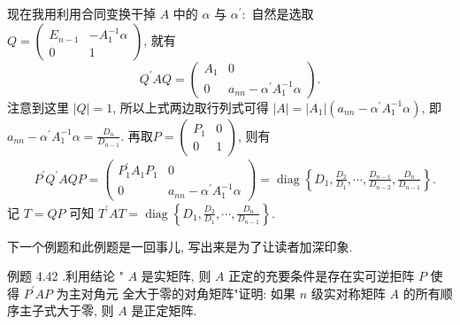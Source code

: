 \documentclass{article}
\begin{document}
现在我用利用合同变换干掉 $A$ 中的 $\alpha$ 与 $\alpha^{\prime}:$ 自然是选取 $Q=\left(\begin{array}{cc}E_{n-1} & -A_{1}^{-1} \alpha \\ 0 & 1\end{array}\right)$, 就有
\begin{equation*}
    Q^{\prime} A Q=\left(\begin{array}{cc}
            A_{1} & 0                                         \\
            0     & a_{n n}-\alpha^{\prime} A_{1}^{-1} \alpha
        \end{array}\right).
\end{equation*}
注意到这里 $|Q|=1$, 所以上式两边取行列式可得 $|A|=\left|A_{1}\right|\left(a_{n n}-\alpha^{\prime} A_{1}^{-1} \alpha\right)$, 即 $a_{n n}-\alpha^{\prime} A_{1}^{-1} \alpha=\frac{D_{n}}{D_{n-1}} .$ 再取$P=\left(\begin{array}{cl}
            P_{1} & 0 \\
            0     & 1
        \end{array}\right)$, 则有
\begin{equation*}
    \begin{aligned}
         & P^{\prime} Q^{\prime} A Q P=\left(\begin{array}{cc}
                P_{1}^{\prime} A_{1} P_{1} & 0                                         \\
                0                          & a_{n n}-\alpha^{\prime} A_{1}^{-1} \alpha
            \end{array}\right)=\operatorname{diag}\left\{D_{1}, \frac{D_{2}}{D_{1}}, \cdots, \frac{D_{n-1}}{D_{n-2}}, \frac{D_{n}}{D_{n-1}}\right\}.
    \end{aligned}
\end{equation*}
记 $T=Q P$ 可知 $T^{\prime} A T=\operatorname{diag}\left\{D_{1}, \frac{D_{2}}{D_{1}}, \cdots, \frac{D_{n}}{D_{n-1}}\right\}$.

\vspace{1ex}
下一个例题和此例题是一回事儿, 写出来是为了让读者加深印象.

{\heiti 例题 4.42 .}{\kaishu 利用结论 " $A$ 是实矩阵, 则 $A$ 正定的充要条件是存在实可逆拒阵 $P$ 使得 $P^{\prime} A P$ 为主对角元 全大于零的对角矩阵"证明: 如果 $n$ 级实对称矩阵 $A$ 的所有顺序主子式大于零, 则 $A$ 是正定矩阵.}
\end{document}
